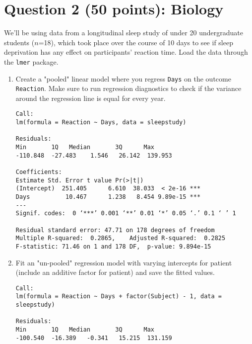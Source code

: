 \documentclass[12pt,letterpaper]{article}
\begin{document}
\section*{Question 2 (50 points): Biology}
\noindent We'll be using data from a longitudinal sleep study of under 20 undergraduate students ($n$=18), which took place over the course of 10 days to see if sleep deprivation has any effect on participants' reaction time. Load the data through the \texttt{lmer} package.

\begin{enumerate}
	\item
	Create a "pooled" linear model where you regress \texttt{Days} on the outcome \texttt{Reaction}. Make sure to run regression diagnostics to check if the variance around the regression line is equal for every year.
	
\begin{Verbatim}
Call:
lm(formula = Reaction ~ Days, data = sleepstudy)

Residuals:
Min       1Q   Median       3Q      Max 
-110.848  -27.483    1.546   26.142  139.953 

Coefficients:
Estimate Std. Error t value Pr(>|t|)    
(Intercept)  251.405      6.610  38.033  < 2e-16 ***
Days          10.467      1.238   8.454 9.89e-15 ***
---
Signif. codes:  0 ‘***’ 0.001 ‘**’ 0.01 ‘*’ 0.05 ‘.’ 0.1 ‘ ’ 1

Residual standard error: 47.71 on 178 degrees of freedom
Multiple R-squared:  0.2865,	Adjusted R-squared:  0.2825 
F-statistic: 71.46 on 1 and 178 DF,  p-value: 9.894e-15
\end{Verbatim}
	\item Fit an "un-pooled" regression model with varying intercepts for patient (include an additive factor for patient) and save the fitted values.
	
\begin{Verbatim}
Call:
lm(formula = Reaction ~ Days + factor(Subject) - 1, data = sleepstudy)

Residuals:
Min       1Q   Median       3Q      Max 
-100.540  -16.389   -0.341   15.215  131.159 


\end{Verbatim}
\end{enumerate}
\end{document}
